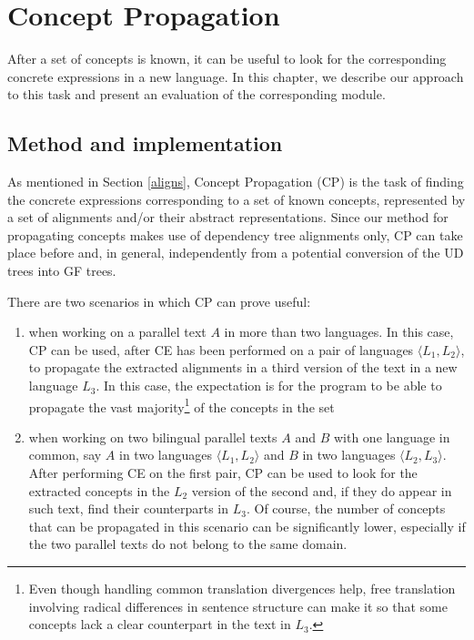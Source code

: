 \chapter{Concept Propagation} \label{ch4}
After a set of concepts is known, it can be useful to look for the corresponding concrete expressions in a new language. In this chapter, we describe our approach to this task and present an evaluation of the corresponding module.

\section{Method and implementation}
As mentioned in Section \ref{aligns}, Concept Propagation (CP) is the task of finding the concrete expressions corresponding to a set of known concepts, represented by a set of alignments and/or their abstract representations. Since our method for propagating concepts makes use of dependency tree alignments only, CP can take place before and, in general, independently from a potential conversion of the UD trees into GF trees. \smallskip

There are two scenarios in which CP can prove useful:\smallskip
\begin{enumerate}
    \item when working on a parallel text $A$ in more than two languages. In this case, CP can be used, after CE has been performed on a pair of languages $\langle L_1,L_2 \rangle$, to propagate the extracted alignments in a third version of the text in a new language $L_3$. In this case, the expectation is for the program to be able to propagate the vast majority\footnote{Even though handling common translation divergences help, free translation involving radical differences in sentence structure can make it so that some concepts lack a clear counterpart in the text in $L_3$.} of the concepts in the set
    \item when working on two bilingual parallel texts $A$ and $B$ with one language in common, say $A$ in two languages $\langle L_1,L_2 \rangle$ and $B$ in two languages $\langle L_2, L_3 \rangle$. After performing CE on the first pair, CP can be used to look for the extracted concepts in the $L_2$ version of the second and, if they do appear in such text, find their counterparts in $L_3$. Of course, the number of concepts that can be propagated in this scenario can be significantly lower, especially if the two parallel texts do not belong to the same domain.
\end{enumerate}\smallskip


